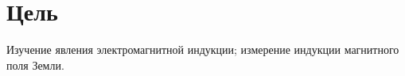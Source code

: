 \section*{Цель}

Изучение явления электромагнитной индукции; измерение индукции
магнитного поля Земли.